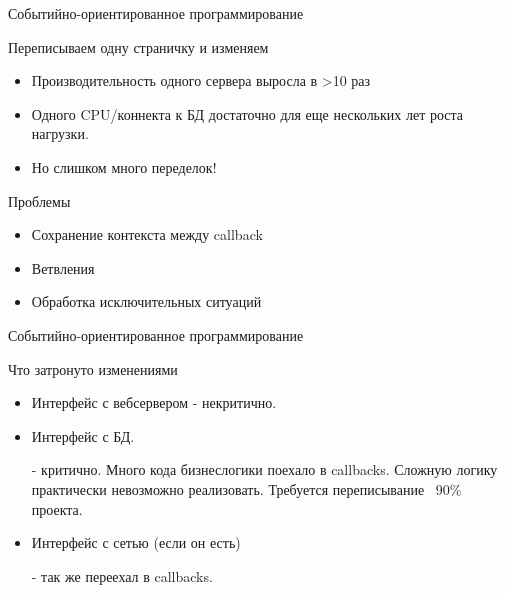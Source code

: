 \documentclass[aspectratio=169]{beamer}
\begin{document}
\begin{frame}{Событийно-ориентированное программирование}
    \begin{block}{Переписываем одну страничку и изменяем}
        \begin{itemize}
            \item Производительность одного сервера выросла в >10 раз
            \item Одного CPU/коннекта к БД достаточно для еще нескольких
                лет роста нагрузки.

            \item Но слишком много переделок!
        \end{itemize}
    \end{block}

    \pause
    \begin{block}{Проблемы}
        \begin{itemize}
            \item Сохранение контекста между callback
            \item Ветвления
            \item Обработка исключительных ситуаций
        \end{itemize}
    \end{block}
\end{frame}


\begin{frame}{Событийно-ориентированное программирование}
    \begin{block}{Что затронуто изменениями}
        \begin{itemize}
            \item Интерфейс с вебсервером - некритично.
            \item Интерфейс с БД.
                \par - критично.
                Много кода бизнеслогики поехало в callbacks. Сложную логику
                практически невозможно реализовать.
                Требуется переписывание ~90\% проекта.
            \item Интерфейс с сетью (если он есть)
                \par - так же переехал в callbacks.
        \end{itemize}
    \end{block}
\end{frame}
\end{document}
